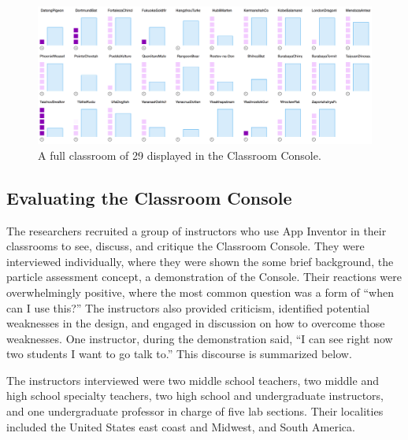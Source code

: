 \begin{figure}
  \centering
      \includegraphics[width=\textwidth]{images/ch4-console-class}
  \caption[Full Classroom Display in the Classroom Console]{A full classroom of 29 displayed in the Classroom Console.}
  \label{fig:console-classroom}
\end{figure}


\subsection{Evaluating the Classroom Console}
\label{sec:console_evaluation}

The researchers recruited a group of instructors who use App Inventor in their classrooms to see, discuss, and critique the Classroom Console. They were interviewed individually, where they were shown the some brief background, the particle assessment concept, a demonstration of the Console. Their reactions were overwhelmingly positive, where the most common question was a form of ``when can I use this?'' The instructors also provided criticism, identified potential weaknesses in the design, and engaged in discussion on how to overcome those weaknesses. One instructor, during the demonstration said, ``I can see right now two students I want to go talk to.'' This discourse is summarized below.

The instructors interviewed were two middle school teachers, two middle and high school specialty teachers, two high school and undergraduate instructors, and one undergraduate professor in charge of five lab sections. Their localities included the United States east coast and Midwest, and South America. 

